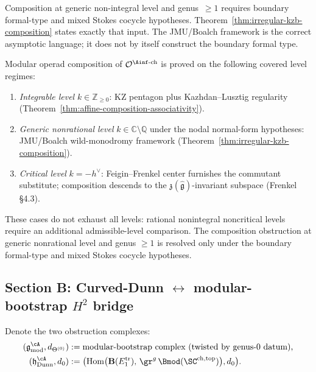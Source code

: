 \begin{remark}
\label{rem:stokes-gap-closed}
Composition at generic non-integral level and genus~\(\ge 1\)
requires boundary formal-type and mixed Stokes cocycle hypotheses.
Theorem~\ref{thm:irregular-kzb-composition} states exactly that
input. The JMU/Boalch framework is the correct
asymptotic language; it does not by itself construct the boundary
formal type.
\end{remark}

\begin{corollary}
\label{cor:fm68-all-levels-resolved}
Modular operad composition of $\mathcal{O}^{\Ainf\text{-ch}}$ is
proved on the following covered level regimes:
\begin{enumerate}[label=\textup{(\alph*)}]
\item \emph{Integrable level} $k \in \mathbb{Z}_{\ge 0}$: KZ
 pentagon plus Kazhdan--Lusztig regularity
 (Theorem~\ref{thm:affine-composition-associativity}).
\item \emph{Generic nonrational level} $k \in \mathbb{C} \setminus
 \mathbb{Q}$ under the nodal normal-form hypotheses: JMU/Boalch
 wild-monodromy framework
 (Theorem~\ref{thm:irregular-kzb-composition}).
\item \emph{Critical level} $k = -h^\vee$: Feigin--Frenkel center
 furnishes the commutant substitute; composition descends to
 the $\mathfrak{z}(\hat{\mathfrak{g}})$-invariant subspace
 (Frenkel~\cite{FrenkelLanglands} \S 4.3).
\end{enumerate}
These cases do not exhaust all levels: rational nonintegral
noncritical levels require an additional admissible-level comparison.
The composition obstruction at generic nonrational level and
genus $\ge 1$ is resolved only under the boundary formal-type and
mixed Stokes cocycle hypotheses.
\end{corollary}

\subsection{Section B: Curved-Dunn $\leftrightarrow$ modular-bootstrap $H^2$ bridge}
\label{subsec:curved-dunn-bridge}

Denote the two obstruction complexes:
\begin{align*}
 (\mathfrak{g}^{\cA}_{\mathrm{mod}}, d_{\Theta^{(0)}})
 &:= \text{modular-bootstrap complex (twisted by genus-$0$ datum),}
 \\
 (\mathfrak{h}^{\cA}_{\mathrm{Dunn}}, d_0)
 &:= \bigl(\mathrm{Hom}\bigl(\mathbf{B}(E_1^{\mathrm{tr}}),\,
 \gr^g\,\Bmod(\SC^{\mathrm{ch,top}})\bigr), d_0\bigr).
\end{align*}

